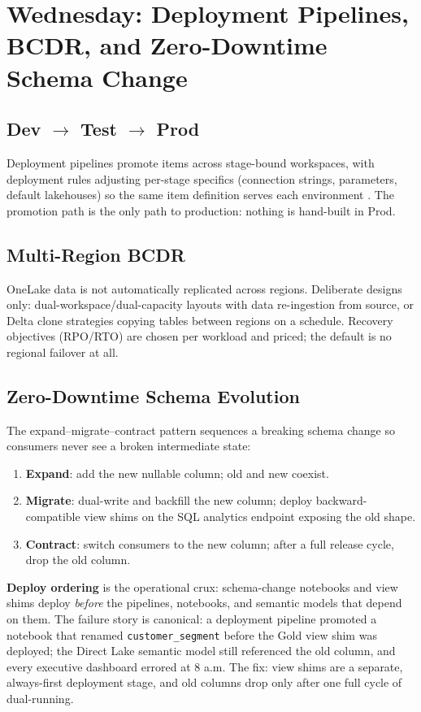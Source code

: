 \section{Wednesday: Deployment Pipelines, BCDR, and Zero-Downtime Schema Change}
\subsection{Dev $\rightarrow$ Test $\rightarrow$ Prod}
Deployment pipelines promote items across stage-bound workspaces, with deployment rules adjusting per-stage specifics (connection strings, parameters, default lakehouses) so the same item definition serves each environment \cite{microsoftFabricDeploymentPipelines}. The promotion path is the only path to production: nothing is hand-built in Prod.

\subsection{Multi-Region BCDR}
OneLake data is not automatically replicated across regions. Deliberate designs only: dual-workspace/dual-capacity layouts with data re-ingestion from source, or Delta clone strategies copying tables between regions on a schedule. Recovery objectives (RPO/RTO) are chosen per workload and priced; the default is no regional failover at all.

\subsection{Zero-Downtime Schema Evolution}
The expand--migrate--contract pattern sequences a breaking schema change so consumers never see a broken intermediate state:

\begin{enumerate}
    \item \textbf{Expand}: add the new nullable column; old and new coexist.
    \item \textbf{Migrate}: dual-write and backfill the new column; deploy backward-compatible view shims on the SQL analytics endpoint exposing the old shape.
    \item \textbf{Contract}: switch consumers to the new column; after a full release cycle, drop the old column.
\end{enumerate}

\textbf{Deploy ordering} is the operational crux: schema-change notebooks and view shims deploy \emph{before} the pipelines, notebooks, and semantic models that depend on them. The failure story is canonical: a deployment pipeline promoted a notebook that renamed \texttt{customer\_segment} before the Gold view shim was deployed; the Direct Lake semantic model still referenced the old column, and every executive dashboard errored at 8 a.m. The fix: view shims are a separate, always-first deployment stage, and old columns drop only after one full cycle of dual-running.

